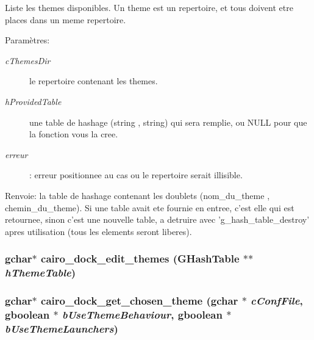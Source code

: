 Liste les themes disponibles. Un theme est un repertoire, et tous doivent etre places dans un meme repertoire. \begin{Desc}
\item[Paramètres:]
\begin{description}
\item[{\em cThemesDir}]le repertoire contenant les themes. \item[{\em hProvidedTable}]une table de hashage (string , string) qui sera remplie, ou NULL pour que la fonction vous la cree. \item[{\em erreur}]: erreur positionnee au cas ou le repertoire serait illisible. \end{description}
\end{Desc}
\begin{Desc}
\item[Renvoie:]la table de hashage contenant les doublets (nom\_\-du\_\-theme , chemin\_\-du\_\-theme). Si une table avait ete fournie en entree, c'est elle qui est retournee, sinon c'est une nouvelle table, a detruire avec 'g\_\-hash\_\-table\_\-destroy' apres utilisation (tous les elements seront liberes). \end{Desc}
\subsubsection{\setlength{\rightskip}{0pt plus 5cm}gchar$\ast$ cairo\_\-dock\_\-edit\_\-themes (GHashTable $\ast$$\ast$ {\em hThemeTable})}\label{cairo-dock-themes-manager_8h_650c4f1420598596e9d144e8d521b7b3}


\subsubsection{\setlength{\rightskip}{0pt plus 5cm}gchar$\ast$ cairo\_\-dock\_\-get\_\-chosen\_\-theme (gchar $\ast$ {\em cConfFile}, gboolean $\ast$ {\em bUseThemeBehaviour}, gboolean $\ast$ {\em bUseThemeLaunchers})}\label{cairo-dock-themes-manager_8h_45bfce739852d43b48219926540d6769}


